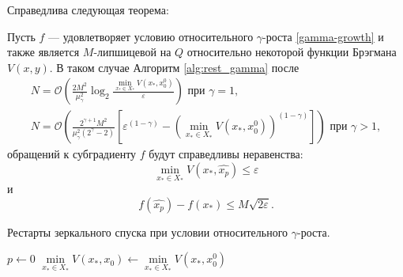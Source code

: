     Справедлива следующая теорема:
    \begin{theorem} \label{simple_restart}
        Пусть $f$ --- удовлетворяет условию относительного $\gamma$-роста \eqref{gamma-growth} и также является $M$-липшицевой на $Q$ относительно некоторой функции Брэгмана $V(x, y)$. В таком случае Алгоритм \ref{alg:rest_gamma} после 
        \begin{equation}
        \begin{aligned}
           N =\mathcal{O}\left(\frac{2 M^2}{\mu_{\gamma}^2} \log_2{\frac{\min\limits_{x_* \in X_*}{V(x_*, x_0^0)}}{\varepsilon}}\right) \text{ при } \gamma = 1, \\
           N = \mathcal{O}\left(\frac{2^{\gamma + 1} M^2}{\mu_{\gamma}^2 (2^{\gamma} - 2)} \left[\varepsilon^{(1 - \gamma)} - \left(\min\limits_{x_* \in X_*}{V(x_*, x_0^0)}\right)^{(1 - \gamma)}\right]\right) \text{ при } \gamma > 1,
        \end{aligned}
        \end{equation}
        обращений к субградиенту $f$ будут справедливы неравенства:
        \begin{equation}
            \min_{x_* \in X_*}{V(x_*, \widehat{x_p})} \leq \varepsilon
        \end{equation}
        и
        \begin{equation}
            f(\widehat{x_p}) - f(x_*) \leq M \sqrt{2 \varepsilon}.  
        \end{equation}
    \end{theorem}

    \begin{algorithm}[htp]
        \caption{Рестарты зеркального спуска при условии относительного $\gamma$-роста.}
        \label{alg:rest_gamma}
        $p \gets 0$\;
        $\min\limits_{x_* \in X_*}{V(x_*, x_0)} \gets \min\limits_{x_* \in X_*}{V(x_*,x_0^0)}$\;
    \end{algorithm}

